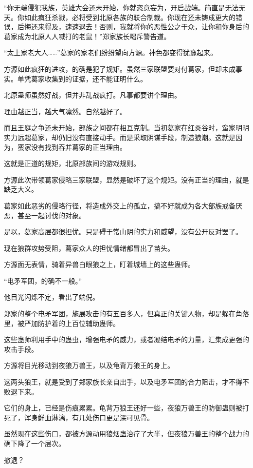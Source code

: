 \begin{this_body}
“你无端侵犯我族，英雄大会还未开始，你就恣意妄为，开启战端。简直是无法无天。你如此疯狂杀戮，必将受到北原各族的联合制裁。你现在还未铸成更大的错误，后悔还来得及，速速退去！否则，我就将你的恶性公之于众，让你和你身后的葛家成为北原人人喊打的老鼠！”郑家族长喝斥警告道。

“太上家老大人……”葛家的家老们纷纷望向方源。神色都变得犹豫起来。

方源如此疯狂的进攻，的确是犯了规矩。虽然三家联盟要对付葛家，但却未成事实。单凭葛家收集到的证据，还不能证明什么。

北原蛊师虽然好战，但并非乱战疯打。凡事都要讲个理由。

理由越正当，越大气凛然。自然越好了。

而且王庭之争还未开始，部族之间都在相互克制。当初葛家在红炎谷时，蛮家明明实力远超葛家，却仍旧没有直接动手。而是采取阴谋手段，制造狼潮。这就是因为，蛮家没有找到吞并葛家的正当理由。

这就是正道的规矩，北原部族间的游戏规则。

方源此次带领葛家侵略三家联盟，显然是破坏了这个规矩。没有正当的理由，就是缺乏大义。

葛家如此恶劣的侵略行径，将造成外交上的孤立，搞不好就成为各大部族戒备厌恶，甚至一起讨伐的对象。

是以，葛家高层都很担忧。只是碍于常山阴的实力和威望，没有公开反对罢了。

现在狼群攻势受阻，葛家众人的担忧情绪都冒出了苗头。

方源面无表情，骑着异兽白眼狼之上，盯着城墙上的这些蛊师。

“电矛军团，的确不一般。”

他目光闪烁不定，看出了端倪。

郑家的整个电矛军团，施展攻击的有五百多人，但真正的关键人物，却是躲在角落里，被严加防护着的上百位辅助蛊师。

这些蛊师利用手中的蛊虫，增强电矛的威力，或者凝结电矛的力量，汇集成更强的攻击手段。

方源将目光移动到夜狼万兽王，以及龟背万狼王的身上。

这两头狼王，就是受到了郑家族长亲自出手，以及电矛军团的合力阻击，才不得不败退下来。

它们的身上，已经是伤痕累累。龟背万狼王还好一些，夜狼万兽王的防御蛊则被打死了，浑身鲜血淋漓，有几处伤口更是深可见骨。

虽然现在这些伤口，都被方源动用狼烟蛊治疗了大半，但夜狼万兽王的整个战力的确下降了一个层次。

撤退？


\end{this_body}
